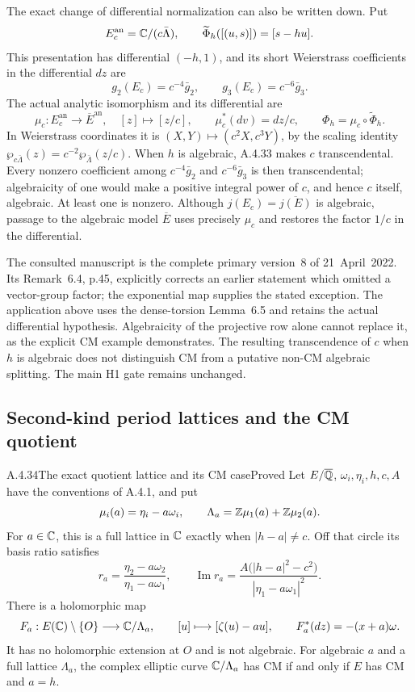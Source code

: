 The exact change of differential normalization can also be
written down. Put
\[
 E_c^{\mathrm{an}}=\mathbb C/(c\bar\Lambda),\qquad
 \widetilde\Phi_h([(u,s)])=[s-hu].
\]
This presentation has differential $(-h,1)$, and its
short Weierstrass coefficients in the differential $dz$ are
\[
 g_2(E_c)=c^{-4}\bar g_2,\qquad
 g_3(E_c)=c^{-6}\bar g_3.
\]
The actual analytic isomorphism and its differential are
\[
 \mu_c:E_c^{\mathrm{an}}\longrightarrow\overline E^{\mathrm{an}},
 \quad[z]\longmapsto[z/c],\qquad
 \mu_c^*(dv)=dz/c,\qquad
 \Phi_h=\mu_c\circ\widetilde\Phi_h.
\]
In Weierstrass coordinates it is $(X,Y)\mapsto(c^2X,c^3Y)$,
by the scaling identity
$\wp_{c\bar\Lambda}(z)=c^{-2}\wp_{\bar\Lambda}(z/c)$.
When $h$ is algebraic, A.4.33 makes $c$ transcendental.
Every nonzero coefficient among $c^{-4}\bar g_2$ and
$c^{-6}\bar g_3$ is then transcendental; algebraicity of
one would make a positive integral power of $c$, and hence
$c$ itself, algebraic. At least one is nonzero.
Although $j(E_c)=\overline{j(E)}$ is algebraic, passage to
the algebraic model $\overline E$ uses precisely $\mu_c$
and restores the factor $1/c$ in the differential.

The consulted manuscript is the complete primary version~8
of 21~April~2022. Its Remark~6.4, p.45, explicitly corrects
an earlier statement which omitted a vector-group factor;
the exponential map supplies the stated exception.
The application above uses the dense-torsion Lemma~6.5
and retains the actual differential hypothesis.
Algebraicity of the projective row alone cannot replace it,
as the explicit CM example demonstrates.
The resulting transcendence of $c$ when $h$ is algebraic
does not distinguish CM from a putative non-CM algebraic
splitting. The main H1 gate remains unchanged.

\subsection{Second-kind period lattices and the CM quotient}

\begin{result}{A.4.34}{The exact quotient lattice and its CM case}{Proved}
Let $E/\overline{\mathbb Q}$, $\omega_i,\eta_i,h,c,A$ have the conventions of A.4.1,
and put
\[
 \mu_i(a)=\eta_i-a\omega_i,\qquad
 \Lambda_a=\mathbb Z\mu_1(a)+\mathbb Z\mu_2(a).
\]
For $a\in\mathbb C$, this is a full lattice in $\mathbb C$ exactly when
$|h-a|\ne c$. Off that circle its basis ratio satisfies
\[
 r_a=\frac{\eta_2-a\omega_2}{\eta_1-a\omega_1},
 \qquad
 \operatorname{Im}r_a
 =\frac{A\bigl(|h-a|^2-c^2\bigr)}
        {|\eta_1-a\omega_1|^2}.
\]
There is a holomorphic map
\[
 F_a:E(\mathbb C)\setminus\{O\}\longrightarrow \mathbb C/\Lambda_a,
 \qquad [u]\longmapsto[\zeta(u)-au],
 \qquad F_a^*(dz)=-(x+a)\omega.
\]
It has no holomorphic extension at $O$ and is not algebraic.
For algebraic $a$ and a full lattice $\Lambda_a$, the complex elliptic
curve $\mathbb C/\Lambda_a$ has CM if and only if $E$ has CM and $a=h$.
\end{result}

